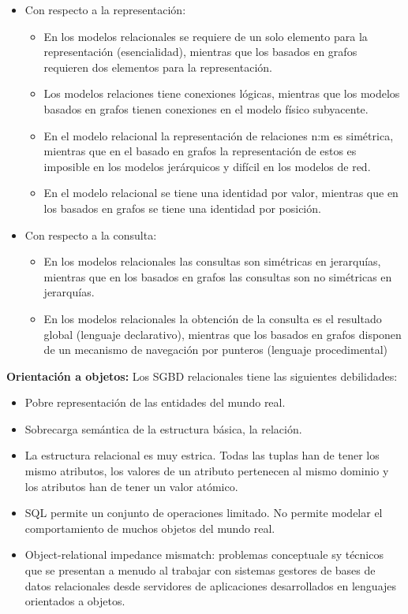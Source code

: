 \documentclass[a4paper,11pt]{article}
\begin{document}
\begin{itemize}
\item Con respecto a la representación: 
	\begin{itemize}
		\item En los modelos relacionales se requiere de un solo elemento para la representación (esencialidad), mientras que los basados en grafos requieren dos elementos para la representación.
		\item Los modelos relaciones tiene conexiones lógicas, mientras que los modelos basados en grafos tienen conexiones en el modelo físico subyacente.
		\item En el modelo relacional la representación de relaciones n:m es simétrica, mientras que en el basado en grafos la representación de estos es imposible en los modelos jerárquicos y difícil en los modelos de red.
		\item En el modelo relacional se tiene una identidad por valor, mientras que en los basados en grafos se tiene una identidad por posición.
	\end{itemize}
	
\item Con respecto a la consulta:
	\begin{itemize}
		\item En los modelos relacionales las consultas son simétricas en jerarquías, mientras que en los basados en grafos las consultas son no simétricas en jerarquías.
		\item En los modelos relacionales la obtención de la consulta es el resultado global (lenguaje declarativo), mientras que los basados en grafos disponen de un mecanismo de navegación por punteros (lenguaje procedimental)
	\end{itemize}
\end{itemize}

\textbf{Orientación a objetos:}
Los SGBD relacionales tiene las siguientes debilidades:
\begin{itemize}
\item Pobre representación de las entidades del mundo real.
\item Sobrecarga semántica de la estructura básica, la relación.
\item La estructura relacional es muy estrica. Todas las tuplas han de tener los mismo atributos, los valores  de un atributo pertenecen al mismo dominio y los atributos han de tener un valor atómico.
\item SQL permite un conjunto de operaciones limitado. No permite modelar el comportamiento de muchos objetos del mundo real.

\item Object-relational impedance mismatch: problemas conceptuale sy técnicos que se presentan a menudo al trabajar con sistemas gestores de bases de datos relacionales desde servidores de aplicaciones desarrollados en lenguajes orientados a objetos.
\end{itemize}
\end{document}
